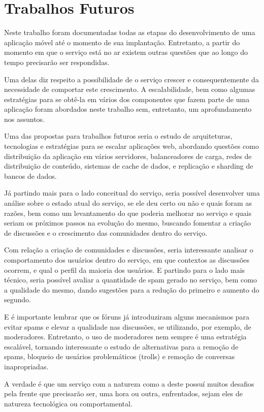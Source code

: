 \documentclass[diss]{template/setrem}
\begin{document}
\chapter*{Trabalhos Futuros}
Neste trabalho foram documentadas todas as etapas do desenvolvimento de uma aplicação móvel até o momento de sua implantação. Entretanto, a partir do momento em que o serviço está no ar existem outras questões que ao longo do tempo precisarão ser respondidas.

Uma delas diz respeito a possibilidade de o serviço crescer e consequentemente da necessidade de comportar este crescimento. A escalabilidade, bem como algumas estratégias para se obtê-la em vários dos componentes que fazem parte de uma aplicação foram abordados neste trabalho sem, entretanto, um aprofundamento nos assuntos.

Uma das propostas para trabalhos futuros seria o estudo de arquiteturas, tecnologias e estratégias para se escalar aplicações web, abordando questões como distribuição da aplicação em vários servidores, balanceadores de carga, redes de distribuição de conteúdo, sistemas de cache de dados, e replicação e sharding de bancos de dados.

Já partindo mais para o lado conceitual do serviço, seria possível desenvolver uma análise sobre o estado atual do serviço, se ele deu certo ou não e quais foram as razões, bem como um levantamento do que poderia melhorar no serviço e quais seriam os próximos passos na evolução do mesmo, buscando fomentar a criação de discussões e o crescimento das comunidades dentro do serviço.

Com relação a criação de comunidades e discussões, seria interessante analisar o comportamento dos usuários dentro do serviço, em que contextos as discussões ocorrem, e qual o perfil da maioria dos usuários. E partindo para o lado mais técnico, seria possível avaliar a quantidade de spam gerado no serviço, bem como a qualidade do mesmo, dando sugestões para a redução do primeiro e aumento do segundo.

E é importante lembrar que os fóruns já introduziram alguns mecanismos para evitar spams e elevar a qualidade nas discussões, se utilizando, por exemplo, de moderadores. Entretanto, o uso de moderadores nem sempre é uma estratégia escalável, tornando interessante o estudo de alternativas para a remoção de spams, bloqueio de usuários problemáticos (trolls) e remoção de conversas inapropriadas.

A verdade é que um serviço com a natureza como a deste possuí muitos desafios pela frente que precisarão ser, uma hora ou outra, enfrentados, sejam eles de natureza tecnológica ou comportamental.




\end{document}
